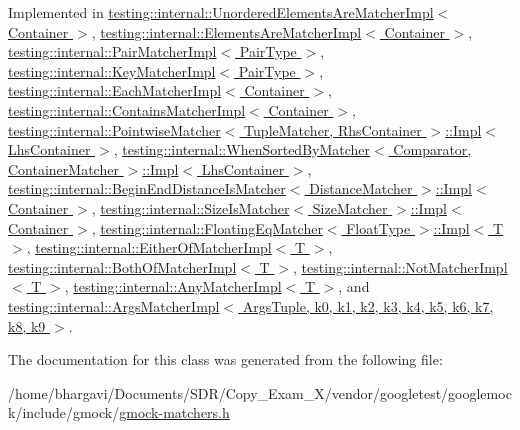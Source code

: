 Implemented in \hyperlink{classtesting_1_1internal_1_1_unordered_elements_are_matcher_impl_a6dc7d9cefa0717b560cef48db83131bf}{testing\+::internal\+::\+Unordered\+Elements\+Are\+Matcher\+Impl$<$ Container $>$}, \hyperlink{classtesting_1_1internal_1_1_elements_are_matcher_impl_a1c5086b897fb07cf3f2a922048faef28}{testing\+::internal\+::\+Elements\+Are\+Matcher\+Impl$<$ Container $>$}, \hyperlink{classtesting_1_1internal_1_1_pair_matcher_impl_a901ef35fe2284f9c0decf41af8143dd2}{testing\+::internal\+::\+Pair\+Matcher\+Impl$<$ Pair\+Type $>$}, \hyperlink{classtesting_1_1internal_1_1_key_matcher_impl_a47683b123c983c7fa9299f1da43b8033}{testing\+::internal\+::\+Key\+Matcher\+Impl$<$ Pair\+Type $>$}, \hyperlink{classtesting_1_1internal_1_1_each_matcher_impl_a6a54a94c14435378e22e8b31670be0b8}{testing\+::internal\+::\+Each\+Matcher\+Impl$<$ Container $>$}, \hyperlink{classtesting_1_1internal_1_1_contains_matcher_impl_a8fa3ebe5a6ba6ccc21c6f9aa6c6bbdb9}{testing\+::internal\+::\+Contains\+Matcher\+Impl$<$ Container $>$}, \hyperlink{classtesting_1_1internal_1_1_pointwise_matcher_1_1_impl_a34f78176359346ba3fd46c7e4c7b08cf}{testing\+::internal\+::\+Pointwise\+Matcher$<$ Tuple\+Matcher, Rhs\+Container $>$\+::\+Impl$<$ Lhs\+Container $>$}, \hyperlink{classtesting_1_1internal_1_1_when_sorted_by_matcher_1_1_impl_a1550eab3f77ff48b54d7a0d33a9d8f31}{testing\+::internal\+::\+When\+Sorted\+By\+Matcher$<$ Comparator, Container\+Matcher $>$\+::\+Impl$<$ Lhs\+Container $>$}, \hyperlink{classtesting_1_1internal_1_1_begin_end_distance_is_matcher_1_1_impl_a623f029822276ab759b312519774e993}{testing\+::internal\+::\+Begin\+End\+Distance\+Is\+Matcher$<$ Distance\+Matcher $>$\+::\+Impl$<$ Container $>$}, \hyperlink{classtesting_1_1internal_1_1_size_is_matcher_1_1_impl_a2d09318bced4fd9adf951009d81a97ff}{testing\+::internal\+::\+Size\+Is\+Matcher$<$ Size\+Matcher $>$\+::\+Impl$<$ Container $>$}, \hyperlink{classtesting_1_1internal_1_1_floating_eq_matcher_1_1_impl_a9cbacc70992f4776a9785716546f13a2}{testing\+::internal\+::\+Floating\+Eq\+Matcher$<$ Float\+Type $>$\+::\+Impl$<$ T $>$}, \hyperlink{classtesting_1_1internal_1_1_either_of_matcher_impl_a0048ea61b3b093603ecdf51006b4d404}{testing\+::internal\+::\+Either\+Of\+Matcher\+Impl$<$ T $>$}, \hyperlink{classtesting_1_1internal_1_1_both_of_matcher_impl_a7b808e95bfee6ea6035e8820896d5d32}{testing\+::internal\+::\+Both\+Of\+Matcher\+Impl$<$ T $>$}, \hyperlink{classtesting_1_1internal_1_1_not_matcher_impl_a9bb6e1bdb6ef18ac9de5a4dd56baa63d}{testing\+::internal\+::\+Not\+Matcher\+Impl$<$ T $>$}, \hyperlink{classtesting_1_1internal_1_1_any_matcher_impl_ae68a082e0c85a0b6f3502698e60333a8}{testing\+::internal\+::\+Any\+Matcher\+Impl$<$ T $>$}, and \hyperlink{classtesting_1_1internal_1_1_args_matcher_impl_a7e2acf3bee2d8038da0f87673bc82eb2}{testing\+::internal\+::\+Args\+Matcher\+Impl$<$ Args\+Tuple, k0, k1, k2, k3, k4, k5, k6, k7, k8, k9 $>$}.



The documentation for this class was generated from the following file\+:\begin{DoxyCompactItemize}
\item 
/home/bhargavi/\+Documents/\+S\+D\+R/\+Copy\+\_\+\+Exam\+\_\+X/vendor/googletest/googlemock/include/gmock/\hyperlink{gmock-matchers_8h}{gmock-\/matchers.\+h}\end{DoxyCompactItemize}

